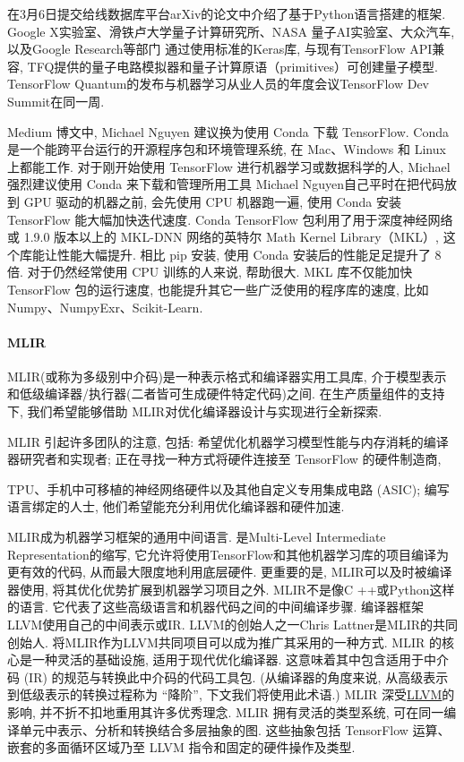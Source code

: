 在3月6日提交给线数据库平台arXiv的论文中介绍了基于Python语言搭建的框架. Google X实验室、滑铁卢大学量子计算研究所、NASA 量子AI实验室、大众汽车, 以及Google Research等部门
通过使用标准的Keras库, 与现有TensorFlow API兼容,  TFQ提供的量子电路模拟器和量子计算原语（primitives）可创建量子模型.
TensorFlow Quantum的发布与机器学习从业人员的年度会议TensorFlow Dev Summit在同一周.

\begin{remark}
Medium 博文中, Michael Nguyen 建议换为使用 Conda 下载 TensorFlow.
Conda 是一个能跨平台运行的开源程序包和环境管理系统, 在 Mac、Windows 和 Linux 上都能工作.
对于刚开始使用 TensorFlow 进行机器学习或数据科学的人, Michael 强烈建议使用 Conda 来下载和管理所用工具
Michael Nguyen自己平时在把代码放到 GPU 驱动的机器之前, 会先使用 CPU 机器跑一遍, 使用 Conda 安装 TensorFlow 能大幅加快迭代速度.
Conda TensorFlow 包利用了用于深度神经网络或 1.9.0 版本以上的 MKL-DNN 网络的英特尔 Math Kernel Library（MKL）, 这个库能让性能大幅提升.
相比 pip 安装, 使用 Conda 安装后的性能足足提升了 8 倍. 对于仍然经常使用 CPU 训练的人来说, 帮助很大.
MKL 库不仅能加快 TensorFlow 包的运行速度, 也能提升其它一些广泛使用的程序库的速度, 比如 Numpy、NumpyExr、Scikit-Learn.
\end{remark}
\paragraph{MLIR}
MLIR(或称为多级别中介码)是一种表示格式和编译器实用工具库, 介于模型表示和低级编译器/执行器(二者皆可生成硬件特定代码)之间. 在生产质量组件的支持下, 我们希望能够借助 MLIR对优化编译器设计与实现进行全新探索.

MLIR 引起许多团队的注意, 包括: 希望优化机器学习模型性能与内存消耗的编译器研究者和实现者;
正在寻找一种方式将硬件连接至 TensorFlow 的硬件制造商,
\begin{example}
  TPU、手机中可移植的神经网络硬件以及其他自定义专用集成电路 (ASIC); 编写语言绑定的人士, 他们希望能充分利用优化编译器和硬件加速.
\end{example}

MLIR成为机器学习框架的通用中间语言. 是Multi-Level Intermediate Representation的缩写, 它允许将使用TensorFlow和其他机器学习库的项目编译为更有效的代码, 从而最大限度地利用底层硬件. 更重要的是, MLIR可以及时被编译器使用, 将其优化优势扩展到机器学习项目之外.
MLIR不是像C ++或Python这样的语言. 它代表了这些高级语言和机器代码之间的中间编译步骤. 编译器框架LLVM使用自己的中间表示或IR. LLVM的创始人之一Chris Lattner是MLIR的共同创始人. 将MLIR作为LLVM共同项目可以成为推广其采用的一种方式.
MLIR 的核心是一种灵活的基础设施, 适用于现代优化编译器. 这意味着其中包含适用于中介码 (IR) 的规范与转换此中介码的代码工具包. (从编译器的角度来说, 从高级表示到低级表示的转换过程称为 “降阶”, 下文我们将使用此术语.)
MLIR 深受\href{https://llvm.org/}{LLVM}的影响, 并不折不扣地重用其许多优秀理念. MLIR 拥有灵活的类型系统, 可在同一编译单元中表示、分析和转换结合多层抽象的图. 这些抽象包括 TensorFlow 运算、嵌套的多面循环区域乃至 LLVM 指令和固定的硬件操作及类型.

